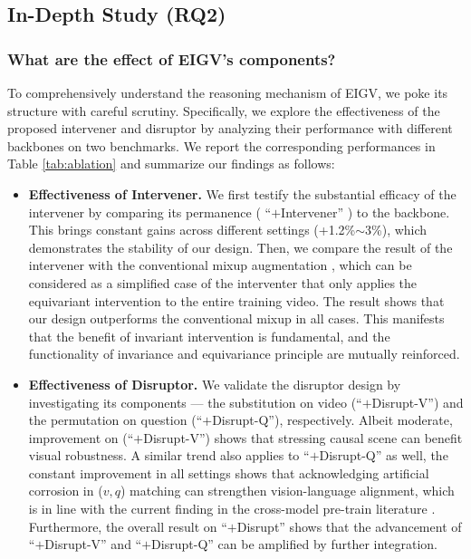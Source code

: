 


\subsection{In-Depth Study (RQ2)}
\vspace{5pt}
\subsubsection{\textbf{What are the effect of EIGV's components?}}

To comprehensively understand the reasoning mechanism of EIGV, we poke its structure with careful scrutiny. Specifically, we explore the effectiveness of the proposed intervener and disruptor by analyzing their performance with different backbones on two benchmarks. We report the corresponding performances in Table \ref{tab:ablation} and summarize our findings as follows:
\begin{itemize}[leftmargin=*]

\vspace{5pt}
\item \noindent \textbf{Effectiveness of Intervener.} \label{exp:intervener}
We first testify the substantial efficacy of the intervener by comparing its permanence ( ``$+$Intervener'' ) to the backbone. This brings constant gains across different settings (+1.2\%$\sim$3\%), which demonstrates the stability of our design. Then, we compare the result of the intervener with the conventional mixup augmentation \cite{DBLP:conf/iclr/ZhangCDL18}, which can be considered as a simplified case of the interventer that only applies the equivariant intervention to the entire training video. The result shows that our design outperforms the conventional mixup in all cases. This manifests that the benefit of invariant intervention is fundamental, and the functionality of invariance and equivariance principle are mutually reinforced.

\vspace{5pt}
\item \noindent \textbf{Effectiveness of Disruptor.} 
We validate the disruptor design by investigating its components --- the substitution on video (``$+$Disrupt-V'') and the permutation on question (``$+$Disrupt-Q''), respectively. 
Albeit moderate, improvement on (``$+$Disrupt-V'') shows that stressing causal scene can benefit visual robustness.
A similar trend also applies to ``$+$Disrupt-Q'' as well, the constant improvement in all settings shows that acknowledging artificial corrosion in ($v,q$) matching can strengthen vision-language alignment, which is in line with the current finding in the cross-model pre-train literature \cite{DBLP:conf/icml/RadfordKHRGASAM21}. 
Furthermore, the overall result on ``$+$Disrupt'' shows that the advancement of ``$+$Disrupt-V'' and ``$+$Disrupt-Q'' can be amplified by further integration. 
\end{itemize}


